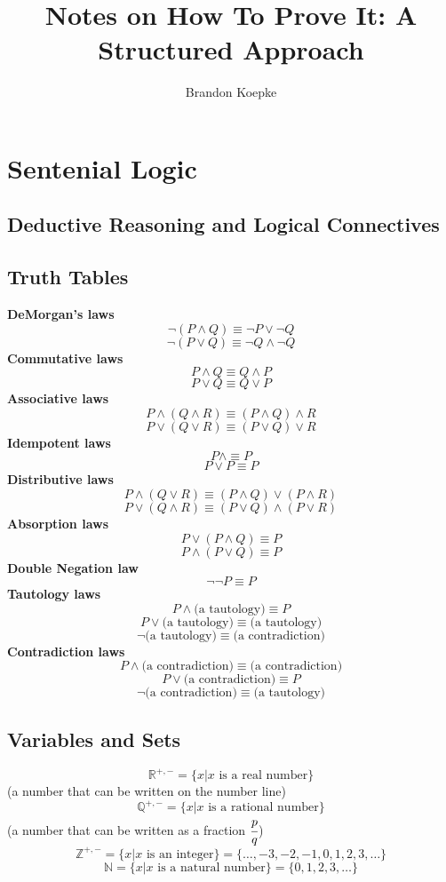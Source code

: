 \documentclass[12pt,twocolumn]{article}
\begin{document}
\title{Notes on How To Prove It: A Structured Approach}
\author{Brandon Koepke}
\maketitle
\section{Sentenial Logic}
\newcommand{\definition}[1]{\textbf{#1}}
\subsection{Deductive Reasoning and Logical Connectives}
\subsection{Truth Tables}
\definition{DeMorgan's laws}
\[
\lnot (P \land Q) \equiv \lnot P \lor \lnot Q
\]
\[
\lnot (P \lor Q) \equiv \lnot Q \land \lnot Q
\]
\definition{Commutative laws}
\[
P \land Q \equiv Q \land P
\]
\[
P \lor Q \equiv Q \lor P
\]
\definition{Associative laws}
\[
P \land (Q \land R) \equiv (P \land Q) \land R
\]
\[
P \lor (Q \lor R) \equiv (P \lor Q) \lor R
\]
\definition{Idempotent laws}
\[
P \land \equiv P
\]
\[
P \lor P \equiv P
\]
\definition{Distributive laws}
\[
P \land (Q \lor R) \equiv (P \land Q) \lor (P \land R)
\]
\[
P \lor (Q \land R) \equiv (P \lor Q) \land (P \lor R)
\]
\definition{Absorption laws}
\[
P \lor (P \land Q) \equiv P
\]
\[
P \land (P \lor Q) \equiv P
\]
\definition{Double Negation law}
\[
\lnot \lnot P \equiv P
\]
\definition{Tautology laws}
\[
P \land \text{(a tautology)} \equiv P
\]
\[
P \lor \text{(a tautology)} \equiv \text{(a tautology)}
\]
\[
\lnot \text{(a tautology)} \equiv \text{(a contradiction)}
\]
\definition{Contradiction laws}
\[
P \land \text{(a contradiction)} \equiv \text{(a contradiction)}
\]
\[
P \lor \text{(a contradiction)} \equiv P
\]
\[
\lnot \text{(a contradiction)} \equiv \text{(a tautology)}
\]
\subsection{Variables and Sets}
\[
\mathbb{R}^{+,-} = \{x | x \text{ is a real number}\}
\]
(a number that can be written on the number line)
\[
\mathbb{Q}^{+,-} = \{x | x \text{ is a rational number}\}
\]
(a number that can be written as a fraction $\cfrac{p}{q}$)
\[
\mathbb{Z}^{+,-} = \{x | x \text{ is an integer}\} = \{ \ldots, -3, -2, -1, 0, 1, 2, 3, \ldots \}
\]
\[
\mathbb{N} = \{x | x \text{ is a natural number}\} = \{0, 1, 2, 3, \ldots \}
\]
\end{document}
